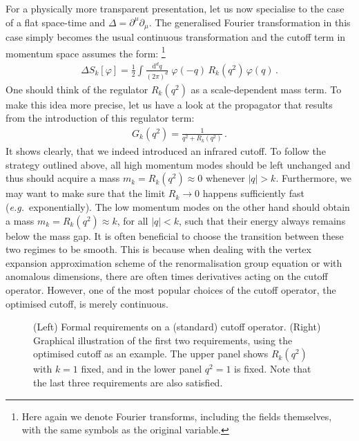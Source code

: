 \documentclass[11pt]{book}
\newcommand\eg{\textit{e.g.}\ }
\numberwithin{equation}{chapter}
\begin{document}
For a physically more transparent presentation, let us now specialise
to the case of a flat space-time
and $\Delta = \partial^\mu \partial_\mu$.
The generalised Fourier transformation in this case simply becomes
the usual continuous transformation and the cutoff term in
momentum space assumes the form:%
\footnote{
  Here again we denote Fourier transforms, including the fields themselves,
  with the same symbols as the original variable.
}
\begin{align}
  \Delta S_k [\varphi] = \frac 12 \int \frac{ \mathrm d^dq }{ (2\pi)^d } \;
  \varphi(-q) \, R_k(q^2) \, \varphi(q) \,.
\end{align}
One should think of the regulator $R_k(q^2)$ as a scale-dependent
mass term. To make this idea more precise, let us have a look
at the propagator that results from the introduction of this regulator term:
\begin{align}
  G_k(q^2) = \frac{1}{ q^2 + R_k(q^2) } \,.
\end{align}
It shows clearly, that we indeed introduced an infrared cutoff.
To follow the strategy outlined above, all high momentum modes
should be left unchanged and thus should acquire a mass
$m_k = R_k(q^2) \approx 0$ whenever $|q| > k$. Furthermore,
we may want to make sure that the limit $R_k \rightarrow 0$
happens sufficiently fast (\eg exponentially). The low momentum
modes on the other hand should obtain a mass $m_k = R_k(q^2) \approx k$,
for all $|q| < k$, such that their energy always remains below the mass gap.
It is often beneficial to choose the transition between these two regimes
to be smooth. This is because when dealing with the vertex expansion
approximation scheme of the renormalisation group equation or with
anomalous dimensions, there are often times derivatives acting on the cutoff
operator. However, one of the most popular choices of the cutoff operator,
the optimised cutoff, is merely continuous.

\begin{figure}
  \begin{center}
    
  \end{center}
  \caption{
    (Left) Formal requirements on a (standard) cutoff operator.
    (Right) Graphical illustration of the first two requirements, using
    the optimised cutoff as an example. The upper panel shows $R_k(q^2)$
    with $k=1$ fixed, and in the lower panel $q^2=1$ is fixed.
    Note that the last three requirements are also satisfied.
  }
  \label{fig:standardcutoff}
\end{figure}
\end{document}
